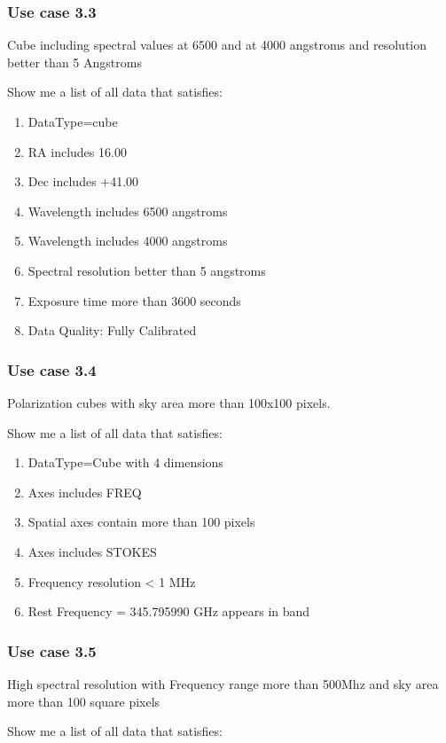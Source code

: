 \documentclass[11pt,a4paper]{ivoa}
\begin{document}
\subsubsection{Use case 3.3}
Cube including spectral values at 6500 and at 4000 angstroms and resolution better than 5 Angstroms

Show me a list of all data that satisfies:

\begin{enumerate}
\item DataType=cube
\item RA includes 16.00
\item Dec includes +41.00
\item Wavelength includes 6500 angstroms
\item Wavelength includes 4000 angstroms
\item Spectral resolution better than 5 angstroms
\item Exposure time more than 3600 seconds
\item Data Quality: Fully Calibrated
\end{enumerate}
\subsubsection{Use case 3.4}
Polarization cubes with sky area more than 100x100 pixels.

Show me a list of all data that satisfies:

\begin{enumerate}
\item DataType=Cube with 4 dimensions
\item Axes includes FREQ
\item Spatial axes contain more than  100 pixels
\item Axes includes STOKES
\item Frequency resolution {\textless} 1 MHz
\item Rest Frequency = 345.795990 GHz appears in band
\end{enumerate}
\subsubsection{Use case 3.5}
High spectral resolution with Frequency range more than 500Mhz and sky area more than 100 square pixels

Show me a list of all data that satisfies:
\end{document}

